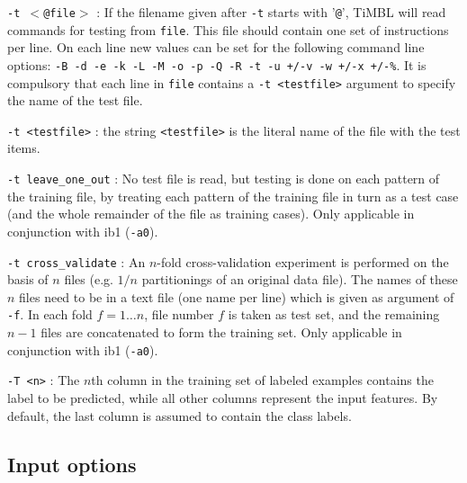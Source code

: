 \documentclass{book}
\begin{document}
\begin{description}
\item {\tt -t $<$@file$>$} : If the filename given after {\tt -t} starts
with '{\tt @}', TiMBL will read commands for testing from {\tt file}.
This file should contain one set of instructions per line. On each
line new values can be set for the following command line options:
{\tt -B -d -e -k -L -M -o -p -Q -R -t -u +/-v -w +/-x +/-\%}. It is
compulsory that each line in {\tt file} contains a {\tt -t <testfile>}
argument to specify the name of the test file.

\item {\tt -t <testfile>} : the string {\tt <testfile>} is the literal name
of the file with the test items.

\item {\tt -t leave\_one\_out} : No test file is read, but testing is
done on each pattern of the training file, by treating each pattern of
the training file in turn as a test case (and the whole remainder of
the file as training cases). Only applicable in conjunction with {\sc ib1} ({\tt -a0}).

\item {\tt -t cross\_validate} : An $n$-fold cross-validation
experiment is performed on the basis of $n$ files (e.g. $1/n$
partitionings of an original data file). The names of these $n$ files
need to be in a text file (one name per line) which is given as
argument of {\tt -f}. In each fold $f=1 \ldots n$, file number $f$ is
taken as test set, and the remaining $n-1$ files are concatenated to
form the training set. Only applicable in conjunction with {\sc ib1} ({\tt -a0}).

\item {\tt -T <n>} : The $n$th column in the training set of labeled
  examples contains the label to be predicted, while all other columns
  represent the input features. By default, the last column is assumed
  to contain the class labels.

\end{description}

\subsection{Input options}
\end{document}
